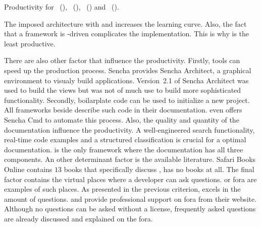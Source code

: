 \documentclass[a4paper]{artikel3}
\begin{document}
\begin{table}[t]
\centering
{}
\caption{Productivity for \st{}~(\sta), \kendo{}~(\kendoa), \jqm{}~(\jqma) and \lungo{}~(\lungoa).}
\label{tabel:evaluatie-productiviteit}
\end{table}


The imposed architecture with \sta{} and \kendoa{} increases the learning curve.
Also, the fact that a framework is \js-driven complicates the implementation.
This is why \sta{} is the least productive.

There are also other factor that influence the productivity.
Firstly,  tools can speed up the production process.
Sencha provides Sencha Architect,  a graphical environment to visualy build applications.
Version~2.1 of Sencha Architect was used to build the views but was not of much use to build more sophisticated functionality.
Secondly,  boilarplate code can be used to initialize a new project.
All frameworks beside \lungo{} describe such code in their documentation.
\sta{} even offers Sencha Cmd to automate this process.
Also, the quality and quantity of the documentation influence the productivity.
A well-engineered search functionality,  real-time code examples and a structured classification is crucial for a optimal documentation.
\kendoa{} is the only framework where the documentation has all three components.  
An other determinant factor is the available literature.
Safari Books Online contains $13$ books that specifically discuss \jqma{},  \lungo{} has no books at all.
The final factor contains the virtual places where a developer can ask questions.
\so{} or fora are examples of such places.
As presented in the previous criterion,  \jqma{} excels in the amount of \so{} questions.
\sta{} and \kendoa{} provide professional support on fora from their website.
Although no questions can be asked without a license,  frequently asked questions are already discussed and explained on the fora.
\end{document}
